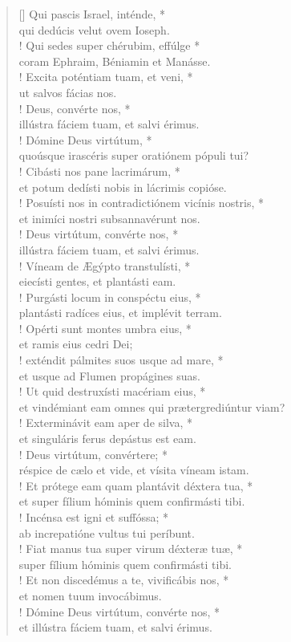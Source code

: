 \begin{verse}[\versewidth]
Qui pascis Israel, inténde, *\\
qui dedúcis velut ovem Ioseph.\\!
\vin Qui sedes super chérubim, effúlge *\\
\vin coram Ephraim, Béniamin et Manásse.\\!
Excita poténtiam tuam, et veni, *\\
ut salvos fácias nos.\\!
\vin Deus, convérte nos, *\\
\vin illústra fáciem tuam, et salvi érimus.\\!
Dómine Deus virtútum, *\\
quoúsque irascéris super oratiónem pópuli tui?\\!
\vin Cibásti nos pane lacrimárum, *\\
\vin et potum dedísti nobis in lácrimis copióse.\\!
Posuísti nos in contradictiónem vicínis nostris, *\\
et inimíci nostri subsannavérunt nos.\\!
\vin Deus virtútum, convérte nos, *\\
\vin illústra fáciem tuam, et salvi érimus.\\!
Víneam de Ægýpto transtulísti, *\\
eiecísti gentes, et plantásti eam.\\!
\vin Purgásti locum in conspéctu eius, *\\
\vin plantásti radíces eius, et implévit terram.\\!
Opérti sunt montes umbra eius, *\\
et ramis eius cedri Dei;\\!
\vin exténdit pálmites suos usque ad mare, *\\
\vin et usque ad Flumen propágines suas.\\!
Ut quid destruxísti macériam eius, *\\
et vindémiant eam omnes qui prætergrediúntur viam?\\!
\vin Exterminávit eam aper de silva, *\\
\vin et singuláris ferus depástus est eam.\\!
Deus virtútum, convértere; *\\
réspice de cælo et vide, et vísita víneam istam.\\!
\vin Et prótege eam quam plantávit déxtera tua, *\\
\vin et super fílium hóminis quem confirmásti tibi.\\!
Incénsa est igni et suffóssa; *\\
ab increpatióne vultus tui períbunt.\\!
\vin Fiat manus tua super virum déxteræ tuæ, *\\
\vin super fílium hóminis quem confirmásti tibi.\\!
Et non discedémus a te, vivificábis nos, *\\
et nomen tuum invocábimus.\\!
\vin Dómine Deus virtútum, convérte nos, *\\
\vin et illústra fáciem tuam, et salvi érimus.\\
\end{verse}
\vspace{1cm}


